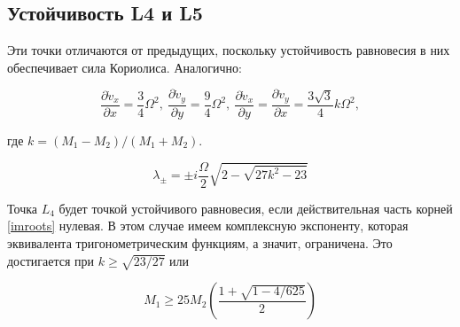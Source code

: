 \documentclass[12pt]{article}
\begin{document}
    \subsection{Устойчивость L4 и L5}
    Эти точки отличаются от предыдущих, поскольку устойчивость равновесия в них
    обеспечивает сила Кориолиса. Аналогично:

    \begin{equation}
        \frac{\partial \dot{v}_x}{\partial x} = \frac{3}{4}\Omega^2,\ 
        \frac{\partial \dot{v}_y}{\partial y} = \frac{9}{4}\Omega^2,\
        \frac{\partial \dot{v}_x}{\partial y} = \frac{\partial \dot{v}_y}{\partial x} = 
        \frac{3\sqrt{3}}{4}k\Omega^2, 
    \end{equation}

    где $k = (M_1 - M_2)/(M_1 + M_2)$.

    \begin{equation}
        \lambda_{\pm} = \pm i\frac{\Omega}{2}\sqrt{2 - \sqrt{27k^2 - 23}}
        \label{imroots}
    \end{equation}

    Точка $L_4$ будет точкой устойчивого равновесия, если действительная часть 
    корней \ref{imroots} нулевая. В этом случае имеем комплексную экспоненту,
    которая эквивалента тригонометрическим функциям, а значит, ограничена. Это
    достигается при $k \geq \sqrt{23/27}$ или 

    \begin{equation}
        M_1 \geq 25M_2\left(\frac{1 + \sqrt{1 - 4/625}}{2}\right)
    \end{equation}

    
    
\end{document}
